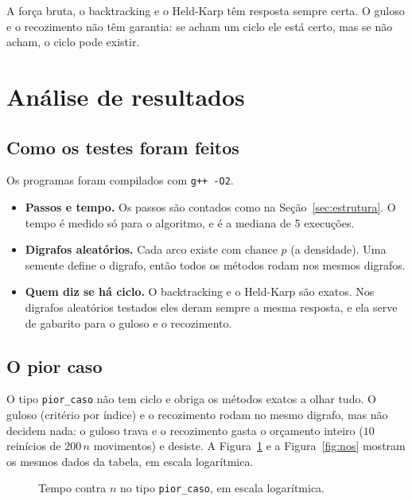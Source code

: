 \documentclass[12pt,a4paper]{article}
\begin{document}
A força bruta, o backtracking e o Held-Karp têm resposta sempre certa. O guloso e o recozimento não têm garantia: se acham um ciclo ele está certo, mas se não acham, o ciclo pode existir.

\section{Análise de resultados}

\subsection{Como os testes foram feitos}

Os programas foram compilados com \texttt{g++ -O2}.

\begin{itemize}
  \item \textbf{Passos e tempo.} Os passos são contados como na Seção~\ref{sec:estrutura}. O tempo é medido só para o algoritmo, e é a mediana de 5 execuções.
  \item \textbf{Digrafos aleatórios.} Cada arco existe com chance $p$ (a densidade). Uma semente define o digrafo, então todos os métodos rodam nos mesmos digrafos.
  \item \textbf{Quem diz se há ciclo.} O backtracking e o Held-Karp são exatos. Nos digrafos aleatórios testados eles deram sempre a mesma resposta, e ela serve de gabarito para o guloso e o recozimento.
\end{itemize}

\subsection{O pior caso}

O tipo \texttt{pior\_caso} não tem ciclo e obriga os métodos exatos a olhar tudo. O guloso (critério por índice) e o recozimento rodam no mesmo digrafo, mas não decidem nada: o guloso trava e o recozimento gasta o orçamento inteiro ($10$ reinícios de $200\,n$ movimentos) e desiste. A Figura~\ref{fig:tempo} e a Figura~\ref{fig:nos} mostram os mesmos dados da tabela, em escala logarítmica.

\begin{center}
\small
\tabelapiorcaso
\end{center}

\begin{figure}[h]
\centering
\graficotempo
\caption{Tempo contra $n$ no tipo \texttt{pior\_caso}, em escala logarítmica.}
\label{fig:tempo}
\end{figure}
\end{document}

